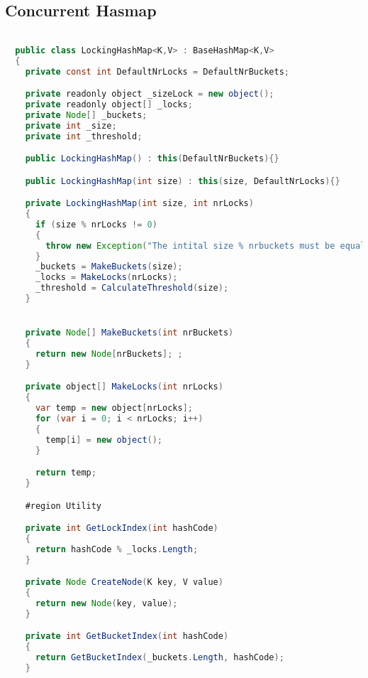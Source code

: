 \subsection{Concurrent Hasmap}
\begin{lstlisting}[label=lst:impl_hashmap_lock,
  caption={Lock based Concurrent Hasmap Implementation},
  language=Java,  
  showspaces=false,
  showtabs=false,
  breaklines=true,
  showstringspaces=false,
  breakatwhitespace=true,
  commentstyle=\color{greencomments},
  keywordstyle=\color{bluekeywords},
  stringstyle=\color{redstrings},
  escapechar=~,
  morekeywords={atomic, retry, orelse, var, get, set, ref, out, readonly, virtual, override, region, endregion, foreach, lock}]  % Start your code-block

  public class LockingHashMap<K,V> : BaseHashMap<K,V>
  {
    private const int DefaultNrLocks = DefaultNrBuckets;

    private readonly object _sizeLock = new object();
    private readonly object[] _locks;
    private Node[] _buckets;
    private int _size;
    private int _threshold;

    public LockingHashMap() : this(DefaultNrBuckets){}

    public LockingHashMap(int size) : this(size, DefaultNrLocks){}

    private LockingHashMap(int size, int nrLocks)
    {
      if (size % nrLocks != 0)
      {
        throw new Exception("The intital size % nrbuckets must be equal to zero");
      }
      _buckets = MakeBuckets(size);
      _locks = MakeLocks(nrLocks);
      _threshold = CalculateThreshold(size);
    }


    private Node[] MakeBuckets(int nrBuckets)
    {
      return new Node[nrBuckets]; ;
    }

    private object[] MakeLocks(int nrLocks)
    {
      var temp = new object[nrLocks];
      for (var i = 0; i < nrLocks; i++)
      {
        temp[i] = new object();
      }

      return temp;
    }

    #region Utility

    private int GetLockIndex(int hashCode)
    {
      return hashCode % _locks.Length;
    }

    private Node CreateNode(K key, V value)
    {
      return new Node(key, value);
    }

    private int GetBucketIndex(int hashCode)
    {
      return GetBucketIndex(_buckets.Length, hashCode);
    }


\end{lstlisting}
